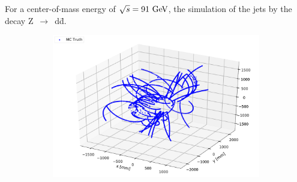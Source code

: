 For a center-of-mass energy of $\sqrt{s} = 91 \,\mathrm{\,Ge\kern -0.1em V}$, the simulation of the jets by the decay Z~$\rightarrow$~d\={d}.

\begin{figure}[ht]
	\centering
	\begin{subfigure}[b]{0.3\textwidth}
        \includegraphics[width=\textwidth]{figures/Zdd_3D.pdf}
        \caption{}


\end{subfigure}
\end{figure}
